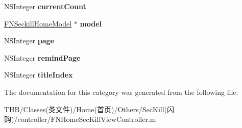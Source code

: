 \begin{DoxyCompactItemize}
N\+S\+Integer {\bfseries current\+Count}
\item 
\mbox{\label{category_f_n_home_sec_kill_view_controller_07_08_ae1c4ba2c485ebabaf97c62a9148b74b1}} 
\mbox{\hyperlink{interface_f_n_seckill_home_model}{F\+N\+Seckill\+Home\+Model}} $\ast$ {\bfseries model}
\item 
\mbox{\label{category_f_n_home_sec_kill_view_controller_07_08_a0261acb9de1a517dd51b3693bb7b4f98}} 
N\+S\+Integer {\bfseries page}
\item 
\mbox{\label{category_f_n_home_sec_kill_view_controller_07_08_a6d938a398b73eabf5a232930de7c2382}} 
N\+S\+Integer {\bfseries remind\+Page}
\item 
\mbox{\label{category_f_n_home_sec_kill_view_controller_07_08_acbd9d06670d9673b1a76fb3ea6642596}} 
N\+S\+Integer {\bfseries title\+Index}
\end{DoxyCompactItemize}


The documentation for this category was generated from the following file\+:\begin{DoxyCompactItemize}
\item 
T\+H\+B/\+Classes(类文件)/\+Home(首页)/\+Others/\+Sec\+Kill(闪购)/controller/F\+N\+Home\+Sec\+Kill\+View\+Controller.\+m\end{DoxyCompactItemize}
